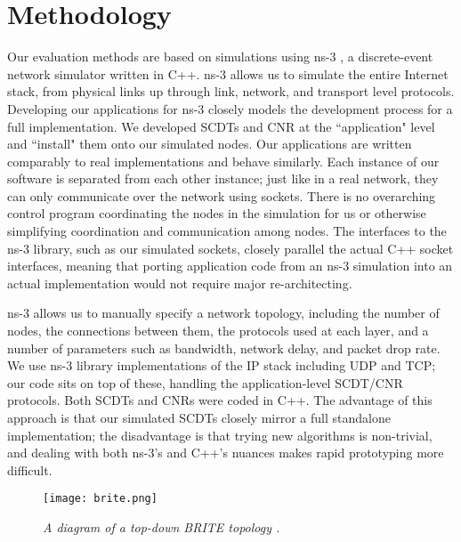 \chapter{Methodology}
\label{simulations}

Our evaluation methods are based on simulations using ns-3 \cite{ns3}, a discrete-event network simulator written in C++. ns-3 allows us to simulate the entire Internet stack, from physical links up through link, network, and transport level protocols. Developing our applications for ns-3 closely models the development process for a full implementation. We developed SCDTs and CNR at the ``application" level and ``install" them onto our simulated nodes. Our applications are written comparably to real implementations and behave similarly. Each instance of our software is separated from each other instance; just like in a real network, they can only communicate over the network using sockets. There is no overarching control program coordinating the nodes in the simulation for us or otherwise simplifying coordination and communication among nodes. The interfaces to the ns-3 library, such as our simulated sockets, closely parallel the actual C++ socket interfaces, meaning that porting application code from an ns-3 simulation into an actual implementation would not require major re-architecting.

ns-3 allows us to manually specify a network topology, including the number of nodes, the connections between them, the protocols used at each layer, and a number of parameters such as bandwidth, network delay, and packet drop rate. We use ns-3 library implementations of the IP stack including UDP and TCP; our code sits on top of these, handling the application-level SCDT/CNR protocols.  Both SCDTs and CNRs were coded in C++.  The advantage of this approach is that our simulated SCDTs closely mirror a full standalone implementation; the disadvantage is that trying new algorithms is non-trivial, and dealing with both ns-3's and C++'s nuances makes rapid prototyping more difficult.

\begin{figure}[h]
	\begin{center}
		\texttt{[image: brite.png]}
	\end{center}
	\vspace{-1.3em}
	\caption{\small \itshape A diagram of a top-down BRITE topology \cite{brite-user}.}
	\vspace{-1em}
	\label{fig:brite}
\end{figure}

